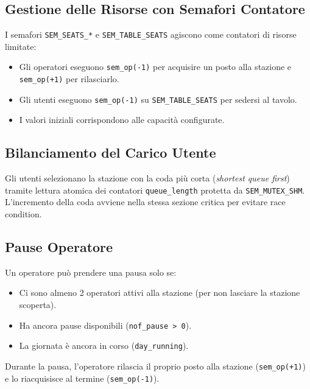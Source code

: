 \documentclass[a4paper,12pt]{article}
\begin{document}
\subsection{Gestione delle Risorse con Semafori Contatore}

I semafori \texttt{SEM\_SEATS\_*} e \texttt{SEM\_TABLE\_SEATS}
agiscono come contatori di risorse limitate:

\begin{itemize}
  \item Gli operatori eseguono \texttt{sem\_op(-1)} per acquisire
        un posto alla stazione e \texttt{sem\_op(+1)} per rilasciarlo.
  \item Gli utenti eseguono \texttt{sem\_op(-1)} su
        \texttt{SEM\_TABLE\_SEATS} per sedersi al tavolo.
  \item I valori iniziali corrispondono alle capacità configurate.
\end{itemize}

\subsection{Bilanciamento del Carico Utente}

Gli utenti selezionano la stazione con la coda più corta
(\textit{shortest queue first}) tramite lettura atomica dei
contatori \texttt{queue\_length} protetta da \texttt{SEM\_MUTEX\_SHM}.
L'incremento della coda avviene nella stessa sezione critica per
evitare race condition.

\subsection{Pause Operatore}

Un operatore può prendere una pausa solo se:
\begin{itemize}
  \item Ci sono almeno 2 operatori attivi alla stazione (per non
        lasciare la stazione scoperta).
  \item Ha ancora pause disponibili (\texttt{nof\_pause > 0}).
  \item La giornata è ancora in corso (\texttt{day\_running}).
\end{itemize}

Durante la pausa, l'operatore rilascia il proprio posto alla stazione
(\texttt{sem\_op(+1)}) e lo riacquisisce al termine
(\texttt{sem\_op(-1)}).

\end{document}
